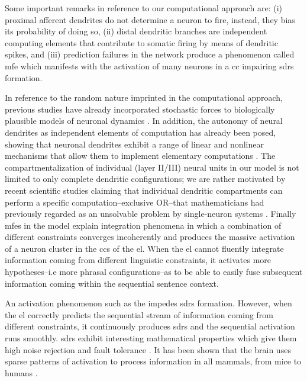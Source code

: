 {Some important remarks in reference to our computational approach \cite{10.1371/journal.pone.0217966} are: (i) proximal afferent dendrites do not determine a neuron to fire, instead, they bias its probability of doing so, (ii) distal dendritic branches are independent computing elements that contribute to somatic firing by means of dendritic spikes, and (iii) prediction failures in the network produce a phenomenon called \gls{mfe} which manifests with the activation of many neurons in a \gls{cc} impairing \glspl{sdr} formation.

In reference to the random nature imprinted in the computational approach, previous studies have already incorporated stochastic forces to biologically plausible models of neuronal dynamics \cite{harrison_l.m_stochastic_2005}. In addition, the autonomy of neural dendrites as independent elements of computation has already been posed, showing that neuronal dendrites exhibit a range of linear and nonlinear mechanisms that allow them to implement elementary computations \cite{poirazi_dendritic_2015, PAYEUR201978}. The compartmentalization of individual (layer II/III) neural units in our model is not limited to only complete dendritic configurations; we are rather motivated by recent scientific studies claiming that individual dendritic compartments can perform a specific computation--exclusive OR--that mathematicians had previously regarded as an unsolvable problem by single-neuron systems \cite{Gidon83}.
Finally \glspl{mfe} in the model explain integration phenomena in which a combination of different constraints converges incoherently and produces the massive activation of a neuron cluster in the \glspl{cc} of the \gls{el}. When the \gls{el} cannot fluently integrate information coming from different linguistic constraints, it activates more hypotheses--i.e more phrasal configurations--as to be able to easily fuse subsequent information coming within the sequential sentence context.

An activation phenomenon such as the  impedes \glspl{sdr} formation. However, when the \gls{el} correctly predicts the sequential stream of information coming from different constraints, it continuously produces \glspl{sdr} and the sequential activation runs smoothly. \glspl{sdr} exhibit interesting mathematical properties which give them high noise rejection and fault tolerance \cite{DBLP:journals/corr/AhmadH15}. It has been shown that the brain uses sparse patterns of activation to process information in all mammals, from mice to humans \cite{barth_experimental_2012}.
}







